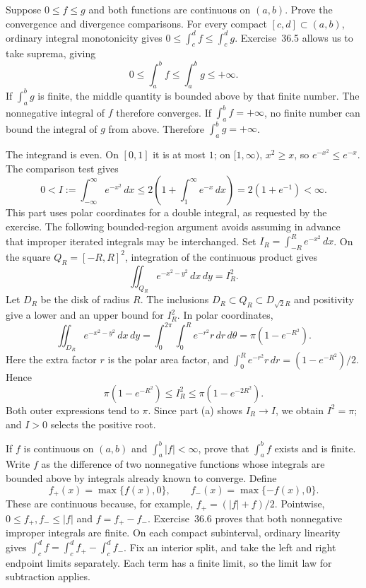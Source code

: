 \goal Suppose $0\leq f\leq g$ and both functions are continuous on
$(a,b)$. Prove the convergence and divergence comparisons.
For every compact $[c,d]\subset(a,b)$, ordinary integral monotonicity
gives $0\leq\int_c^d f\leq\int_c^d g$. Exercise~36.5 allows us to
take suprema, giving
\[
 0\leq\int_a^b f\leq\int_a^b g\leq+\infty.
\]
If $\int_a^b g$ is finite, the middle quantity is bounded above by
that finite number. The nonnegative integral of $f$ therefore converges.
If $\int_a^b f=+\infty$, no finite number can bound the integral
of $g$ from above. Therefore $\int_a^b g=+\infty$.

The integrand is even. On $[0,1]$ it is at most $1$; on $[1,\infty)$,
$x^2\geq x$, so $e^{-x^2}\leq e^{-x}$. The comparison test gives
\[
 0<I:=\int_{-\infty}^{\infty}e^{-x^2}\,dx
 \leq2\left(1+\int_1^\infty e^{-x}\,dx\right)
 =2(1+e^{-1})<\infty.
\]
This part uses polar coordinates for a double integral, as requested
by the exercise. The following bounded-region argument avoids assuming
in advance that improper iterated integrals may be interchanged.
Set $I_R=\int_{-R}^R e^{-x^2}\,dx$. On the square
$Q_R=[-R,R]^2$, integration of the continuous product gives
\[
 \iint_{Q_R}e^{-x^2-y^2}\,dx\,dy=I_R^2.
\]
Let $D_R$ be the disk of radius $R$. The inclusions
$D_R\subset Q_R\subset D_{\sqrt2R}$ and positivity give a lower
and an upper bound for $I_R^2$. In polar coordinates,
\[
 \iint_{D_R}e^{-x^2-y^2}\,dx\,dy
 =\int_0^{2\pi}\int_0^R e^{-r^2}r\,dr\,d\theta
 =\pi(1-e^{-R^2}).
\]
Here the extra factor $r$ is the polar area factor, and
$\int_0^R e^{-r^2}r\,dr=(1-e^{-R^2})/2$. Hence
\[
 \pi(1-e^{-R^2})\leq I_R^2\leq\pi(1-e^{-2R^2}).
\]
Both outer expressions tend to $\pi$. Since part (a) shows
$I_R\to I$, we obtain $I^2=\pi$; and $I>0$ selects the positive root.

\goal If $f$ is continuous on $(a,b)$ and $\int_a^b|f|<\infty$,
prove that $\int_a^b f$ exists and is finite.
\idea Write $f$ as the difference of two nonnegative functions whose
integrals are bounded above by integrals already known to converge.
Define
\[
 f_+(x)=\max\{f(x),0\},\qquad
 f_-(x)=\max\{-f(x),0\}.
\]
These are continuous because, for example,
$f_+=(|f|+f)/2$. Pointwise, $0\leq f_+,f_-\leq|f|$ and
$f=f_+-f_-$. Exercise~36.6 proves that both nonnegative improper
integrals are finite.
On each compact subinterval, ordinary linearity gives
$\int_c^d f=\int_c^d f_+-\int_c^d f_-$. Fix an interior split,
and take the left and right endpoint limits separately. Each term
has a finite limit, so the limit law for subtraction applies.

